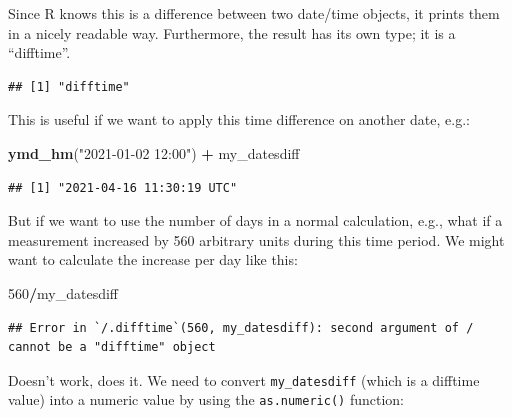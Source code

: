 \documentclass[
  12pt,
  krantz2]{krantz}
\makeatletter
\newenvironment{Shaded}{\begin{snugshade}}{\end{snugshade}}
\newcommand{\DecValTok}[1]{\textcolor[rgb]{0.00,0.00,0.81}{#1}}
\newcommand{\KeywordTok}[1]{\textcolor[rgb]{0.13,0.29,0.53}{\textbf{#1}}}
\newcommand{\NormalTok}[1]{#1}
\newcommand{\OperatorTok}[1]{\textcolor[rgb]{0.81,0.36,0.00}{\textbf{#1}}}
\newcommand{\StringTok}[1]{\textcolor[rgb]{0.31,0.60,0.02}{#1}}
\newenvironment{kframe}{%
\medskip{}
\setlength{\fboxsep}{.8em}
 \def\at@end@of@kframe{}%
 \ifinner\ifhmode%
  \def\at@end@of@kframe{\end{minipage}}%
  \begin{minipage}{\columnwidth}%
 \fi\fi%
 \def\FrameCommand##1{\hskip\@totalleftmargin \hskip-\fboxsep
 \colorbox{shadecolor}{##1}\hskip-\fboxsep
     \hskip-\linewidth \hskip-\@totalleftmargin \hskip\columnwidth}%
 \MakeFramed {\advance\hsize-\width
   \@totalleftmargin\z@ \linewidth\hsize
   \@setminipage}}%
 {\par\unskip\endMakeFramed%
 \at@end@of@kframe}
\renewenvironment{Shaded}{\begin{kframe}}{\end{kframe}}
\makeatother
\begin{document}
Since R knows this is a difference between two date/time objects, it prints them in a nicely readable way.
Furthermore, the result has its own type; it is a ``difftime''.

\begin{Shaded}
\end{Shaded}

\begin{verbatim}
## [1] "difftime"
\end{verbatim}

This is useful if we want to apply this time difference on another date, e.g.:

\begin{Shaded}
\begin{Highlighting}[]
\KeywordTok{ymd_hm}\NormalTok{(}\StringTok{"2021-01-02 12:00"}\NormalTok{) }\OperatorTok{+}\StringTok{ }\NormalTok{my_datesdiff}
\end{Highlighting}
\end{Shaded}

\begin{verbatim}
## [1] "2021-04-16 11:30:19 UTC"
\end{verbatim}

But if we want to use the number of days in a normal calculation, e.g., what if a measurement increased by 560 arbitrary units during this time period.
We might want to calculate the increase per day like this:

\begin{Shaded}
\begin{Highlighting}[]
\DecValTok{560}\OperatorTok{/}\NormalTok{my_datesdiff}
\end{Highlighting}
\end{Shaded}

\begin{verbatim}
## Error in `/.difftime`(560, my_datesdiff): second argument of / cannot be a "difftime" object
\end{verbatim}

Doesn't work, does it.
We need to convert \texttt{my\_datesdiff} (which is a difftime value) into a numeric value by using the \texttt{as.numeric()} function:
\end{document}

